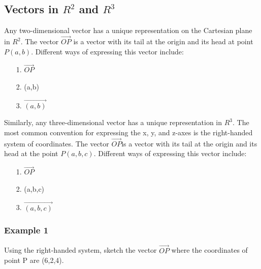 \documentclass{article}
\begin{document}
\subsection{Vectors in $R^2$ and $R^3$}
Any two-dimensional vector has a unique representation on the Cartesian plane in $R^2$.  The vector $\overrightarrow{OP}$ is a vector with its tail at the origin and its head at point $P(a,b)$. Different ways of expressing this vector include:
\begin{enumerate}
    \item[1.] $\overrightarrow{OP}$
    \item[2.](a,b)
    \item[3.] $\overrightarrow{(a,b)}$
\end{enumerate}
Similarly, any three-dimensional vector has a unique representation in $R^3$. The most common convention for expressing the x, y, and z-axes is the right-handed system of coordinates.  The vector $\overrightarrow{OP}$is a vector with its tail at the origin and its head at the point $P(a,b,c)$. Different ways of expressing this vector include:
\begin{enumerate}
    \item[1.] $\overrightarrow{OP}$
    \item[2.](a,b,c)
    \item[3.] $\overrightarrow{(a,b,c)}$
\end{enumerate}
\subsubsection*{Example 1} Using the right-handed system, sketch the vector $\overrightarrow{OP}$ where the coordinates of point P are (6,2,4).
\begin{center}
\centering
\end{center}
\end{document}
